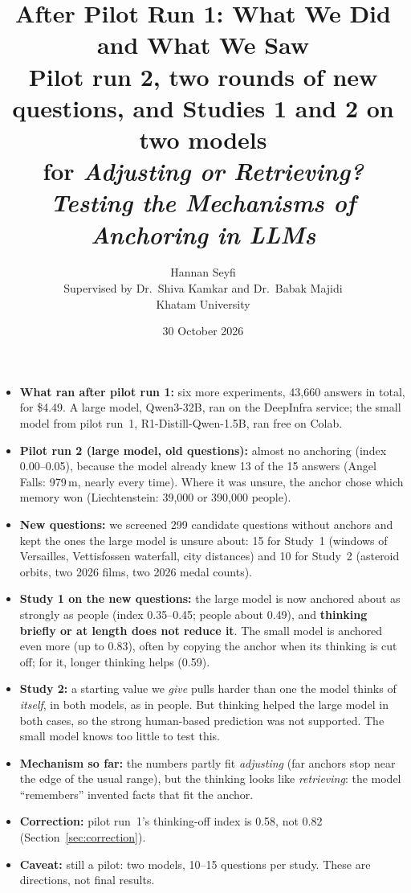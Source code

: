 \documentclass[11pt,a4paper]{article}
\title{\textbf{After Pilot Run 1: What We Did and What We Saw}\\[4pt]
\large Pilot run 2, two rounds of new questions, and Studies 1 and 2 on two models\\
\large for \emph{Adjusting or Retrieving? Testing the Mechanisms of Anchoring in LLMs}}
\author{Hannan Seyfi\\[8pt]
\normalsize Supervised by Dr.\ Shiva Kamkar and Dr.\ Babak Majidi\\[8pt]
\normalsize Khatam University}
\date{30 October 2026}
\begin{document}
\maketitle
\thispagestyle{plain}

\begin{tcolorbox}[colback=gray!6, colframe=gray!50, title=\textbf{At a glance}, fonttitle=\normalsize]
\begin{itemize}[leftmargin=*]
  \item \textbf{What ran after pilot run 1:} six more experiments, 43,660 answers in total, for \$4.49. A large model, Qwen3-32B, ran on the DeepInfra service; the small model from pilot run~1, R1-Distill-Qwen-1.5B, ran free on Colab.
  \item \textbf{Pilot run 2 (large model, old questions):} almost no anchoring (index 0.00--0.05), because the model already knew 13 of the 15 answers (Angel Falls: 979\,m, nearly every time). Where it was unsure, the anchor chose which memory won (Liechtenstein: 39,000 or 390,000 people).
  \item \textbf{New questions:} we screened 299 candidate questions without anchors and kept the ones the large model is unsure about: 15 for Study~1 (windows of Versailles, Vettisfossen waterfall, city distances) and 10 for Study~2 (asteroid orbits, two 2026 films, two 2026 medal counts).
  \item \textbf{Study 1 on the new questions:} the large model is now anchored about as strongly as people (index 0.35--0.45; people about 0.49), and \textbf{thinking briefly or at length does not reduce it}. The small model is anchored even more (up to 0.83), often by copying the anchor when its thinking is cut off; for it, longer thinking helps (0.59).
  \item \textbf{Study 2:} a starting value we \emph{give} pulls harder than one the model thinks of \emph{itself}, in both models, as in people. But thinking helped the large model in both cases, so the strong human-based prediction was not supported. The small model knows too little to test this.
  \item \textbf{Mechanism so far:} the numbers partly fit \emph{adjusting} (far anchors stop near the edge of the usual range), but the thinking looks like \emph{retrieving}: the model \enquote{remembers} invented facts that fit the anchor.
  \item \textbf{Correction:} pilot run~1's thinking-off index is 0.58, not 0.82 (Section~\ref{sec:correction}).
  \item \textbf{Caveat:} still a pilot: two models, 10--15 questions per study. These are directions, not final results.
\end{itemize}
\end{tcolorbox}
\end{document}
